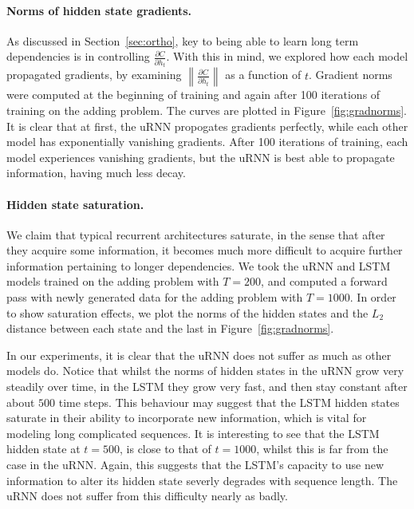 \documentclass{article} %
\newcommand\norm[1]{\left\lVert#1\right\rVert}
\begin{document}
\paragraph{Norms of hidden state gradients.} As discussed in Section~\ref{sec:ortho}, key to being able to learn long term 
dependencies is in controlling $\frac{\partial C}{\partial h_t}$. 
With this in mind, we explored how each model propagated gradients, by examining 
$\norm{\frac{\partial C}{\partial h_t}}$ as a function of $t$. 
Gradient norms were computed at the beginning of training and again after 100 iterations of
training on the adding problem. The curves are plotted in Figure~\ref{fig:gradnorms}.
It is clear that at first, the uRNN propogates gradients perfectly, while each other model has 
exponentially vanishing gradients. 
After 100 iterations of training, each model experiences vanishing gradients, 
but the uRNN is best able to propagate information, having much less decay.

\paragraph{Hidden state saturation.} We claim that typical recurrent architectures saturate, in the 
sense that after they acquire some information, it becomes much more difficult to acquire further information pertaining
to longer dependencies.  
We took the uRNN and LSTM models trained on the adding problem with $T=200$, and computed 
a forward pass with newly generated data for the adding problem with $T=1000$. In order to show saturation
effects, we plot the norms of the hidden states and the $L_2$ distance between each state and the last in
Figure~\ref{fig:gradnorms}.    

In our experiments, it is clear that the uRNN does not suffer as much as other models do.
Notice that whilst the norms of hidden states in the uRNN grow very steadily over time, in the LSTM
they grow very fast, and then stay constant after about $500$ time steps. This behaviour may
suggest that the LSTM hidden states saturate in their ability to incorporate new information, which is vital
for modeling long complicated sequences. It is interesting to see that the LSTM hidden state at $t=500$, 
is close to that of $t=1000$, whilst this is far from the case in the uRNN. Again, this suggests that
the LSTM's capacity to use new information to alter its hidden state severly degrades with sequence length.
The uRNN does not suffer from this difficulty nearly as badly. 
\end{document}
